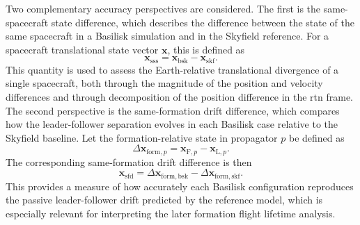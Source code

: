 Two complementary accuracy perspectives are considered. The first is the same-spacecraft state difference, which describes the difference between the state of the same spacecraft in a Basilisk simulation and in the Skyfield reference. For a spacecraft translational state vector $\mathbf{x}$, this is defined as
\begin{equation}
    \mathbf{x}_{\mathrm{sss}}
    =
    \mathbf{x}_{\mathrm{bsk}}
    -
    \mathbf{x}_{\mathrm{skf}} .
\end{equation}
This quantity is used to assess the Earth-relative translational divergence of a single spacecraft, both through the magnitude of the position and velocity differences and through decomposition of the position difference in the \gls{rtn} frame. The second perspective is the same-formation drift difference, which compares how the leader-follower separation evolves in each Basilisk case relative to the Skyfield baseline. Let the formation-relative state in propagator $p$ be defined as
\begin{equation}
    \Delta \mathbf{x}_{\mathrm{form},p}
    =
    \mathbf{x}_{\mathrm{F},p}
    -
    \mathbf{x}_{\mathrm{L},p}.
\end{equation}
The corresponding same-formation drift difference is then
\begin{equation}
    \mathbf{x}_{\mathrm{sfd}}
    =
    \Delta \mathbf{x}_{\mathrm{form,bsk}}
    -
    \Delta \mathbf{x}_{\mathrm{form,skf}} .
\end{equation}
This provides a measure of how accurately each Basilisk configuration reproduces the passive leader-follower drift predicted by the reference model, which is especially relevant for interpreting the later formation flight lifetime analysis.
